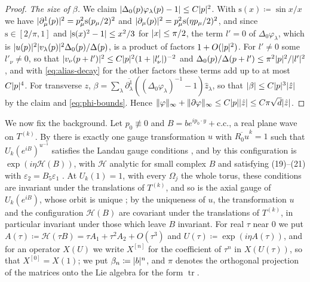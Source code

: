 \documentclass[11pt]{preprint}
\newcommand{\tr}{\operatorname{tr}}
\DeclarePairedDelimiter{\abs}{\lvert}{\rvert}
\DeclarePairedDelimiter{\norm}{\lVert}{\rVert}
\numberwithin{equation}{section}
\theoremstyle{definition}
\theoremstyle{remark}
\theoremstyle{plain}
\begin{document}
\begin{proof}
\emph{The size of $\beta$.} We claim $\abs{\Delta_0(p)\varphi_\lambda(p) - 1} \leq C\abs{p}^2$. With $\mathrm s(x) \coloneqq \sin x/x$ we have $\abs{\partial^1_\mu(p)}^2 = p_\mu^2\mathrm s(p_\mu/2)^2$ and $\abs{\partial_\mu(p)}^2 = p_\mu^2\mathrm s(\eta p_\mu/2)^2$, and since $\mathrm s \in [2/\pi, 1]$ and $\abs{\mathrm s(x)^2 - 1} \leq x^2/3$ for $\abs{x} \leq \pi/2$, the term $l' = 0$ of $\Delta_0\varphi_\lambda$, which is $\abs{u(p)}^2\abs{v_\lambda(p)}^2\Delta_0(p)/\Delta(p)$, is a product of factors $1 + O(\abs{p}^2)$. For $l' \neq 0$ some $l'_\nu \neq 0$, so that $\abs{v_\nu(p + l')}^2 \leq C\abs{p}^2(1 + \abs{l'_\nu})^{-2}$ and $\Delta_0(p)/\Delta(p + l') \leq \pi^2\abs{p}^2/\abs{l'}^2$, and with \eqref{eq:alias-decay} for the other factors these terms add up to at most $C\abs{p}^4$. For transverse $z$, $\beta = \sum_\lambda\overline{\partial^1_\lambda}((\Delta_0\varphi_\lambda)^{-1} - 1)\hat z_\lambda$, so that $\abs{\beta} \leq C\abs{p}^3\abs{\hat z}$ by the claim and \eqref{eq:phi-bounds}. Hence $\norm{\varphi}_\infty + \norm{\partial\varphi}_\infty \leq C\abs{p}\abs{\hat z} \leq C\pi\sqrt d\abs{\hat z}$.
\end{proof}

We now fix the background. Let $p_0 \not\equiv 0$ and $B = be^{ip_0\cdot y} + \mathrm{c.c.}$, a real plane wave on $T^{(k)}$. By \cite[p.~281, ll.~2--3]{BalabanVAR} there is exactly one gauge transformation $u$ with $\overline{R_0u}^k = 1$ such that $U_k(e^{iB})^{u^{-1}}$ satisfies the Landau gauge conditions \cite[(19)--(21), p.~281]{BalabanVAR}, and by \cite[Proposition~9, p.~309]{BalabanVAR} this configuration is $\exp(i\eta\mathscr H(B))$, with $\mathscr H$ analytic for small complex $B$ and satisfying (19)--(21) with $\varepsilon_2 = B_5\varepsilon_1$ \cite[(173), p.~305]{BalabanVAR}. At $U_k(1) = 1$, with every $\Omega_j$ the whole torus, these conditions are invariant under the translations of $T^{(k)}$, and so is the axial gauge of $U_k(e^{iB})$, whose orbit is unique \cite[p.~279]{BalabanVAR}; by the uniqueness of $u$, the transformation $u$ and the configuration $\mathscr H(B)$ are covariant under the translations of $T^{(k)}$, in particular invariant under those which leave $B$ invariant. For real $\tau$ near $0$ we put $A(\tau) \coloneqq \mathscr H(\tau B) = \tau A_1 + \tau^2A_2 + O(\tau^3)$ and $U(\tau) \coloneqq \exp(i\eta A(\tau))$, and for an operator $X(U)$ we write $X^{[n]}$ for the coefficient of $\tau^n$ in $X(U(\tau))$, so that $X^{[0]} = X(1)$; we put $\beta_n \coloneqq \abs{b}^n$, and $\pi$ denotes the orthogonal projection of the matrices onto the Lie algebra for the form $\tr$.
\end{document}
